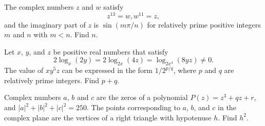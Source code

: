 \documentclass[11pt]{article}
\theoremstyle{definition}
\begin{document}
\begin{question}[name={2012 AIME I, \href{https://artofproblemsolving.com/community/c4p2630386}{Problem 6}}]
	The complex numbers $z$ and $w$ satisfy $$z^{13} = w, w^{11} = z,$$ and the imaginary part of $z$ is $\sin\left({m\pi}/n\right)$ for relatively prime positive integers $m$ and $n$ with $m < n$. Find $n$.
\end{question}


%	












\begin{question}[name={2012 AIME I, \href{https://artofproblemsolving.com/community/c4p2630559}{Problem 9}}]
	Let $x$, $y$, and $z$ be positive real numbers that satisfy\[ 2\log_x(2y) = 2\log_{2x}(4z) = \log_{2x^4}(8yz) \neq 0. \]The value of $xy^5z$ can be expressed in the form ${1}/{2^{p/q}}$, where $p$ and $q$ are relatively prime integers. Find $p+q$.
\end{question}


%	










\begin{question}[name={2012 AIME I, \href{https://artofproblemsolving.com/community/c4p2630575}{Problem 14}}]
	Complex numbers $a$, $b$ and $c$ are the zeros of a polynomial $P(z) = z^3+qz+r$, and $|a|^2+|b|^2+|c|^2=250$. The points corresponding to $a$, $b$, and $c$ in the complex plane are the vertices of a right triangle with hypotenuse $h$. Find $h^2$.
\end{question}


%	
\end{document}
